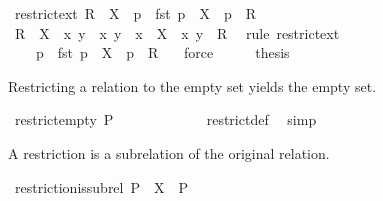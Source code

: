 \begin{isabellebody}
\isamarkupfalse%
\ restrict{\isacharunderscore}ext{\isacharprime}{\isacharcolon}\ {\isachardoublequoteopen}R\ {\isacharbar}{\isacharbar}\ X\ {\isacharequal}\ {\isacharbraceleft}p\ {\isachardot}\ fst\ p\ {\isasymin}\ X\ {\isasymand}\ p\ {\isasymin}\ R{\isacharbraceright}{\isachardoublequoteclose}\isanewline
%
\isadelimproof
%
\endisadelimproof
%
\isatagproof
{}\isamarkupfalse%
\ {\isacharminus}\isanewline
\ \ \isamarkupfalse%
\ {\isachardoublequoteopen}R\ {\isacharbar}{\isacharbar}\ X\ {\isacharequal}\ {\isacharbraceleft}{\isacharparenleft}x{\isacharcomma}\ y{\isacharparenright}\ {\isacharbar}\ x\ y\ {\isachardot}\ x\ {\isasymin}\ X\ {\isasymand}\ {\isacharparenleft}x{\isacharcomma}\ y{\isacharparenright}\ {\isasymin}\ R{\isacharbraceright}{\isachardoublequoteclose}\ \isamarkupfalse%
\ {\isacharparenleft}rule\ restrict{\isacharunderscore}ext{\isacharparenright}\isanewline
\ \ \isamarkupfalse%
\ \isamarkupfalse%
\ {\isachardoublequoteopen}{\isasymdots}\ {\isacharequal}\ {\isacharbraceleft}\ p\ {\isachardot}\ fst\ p\ {\isasymin}\ X\ {\isasymand}\ p\ {\isasymin}\ R\ {\isacharbraceright}{\isachardoublequoteclose}\ \isamarkupfalse%
\ force\isanewline
\ \ \isamarkupfalse%
\ \isamarkupfalse%
\ {\isacharquery}thesis\ \isacommand{{\isachardot}}\isamarkupfalse%
\isanewline
{}\isamarkupfalse%
%
\endisatagproof
{\isafoldproof}%
%
\isadelimproof
%
\endisadelimproof
%
\begin{isamarkuptext}%
Restricting a relation to the empty set yields the empty set.%
\end{isamarkuptext}%
\isamarkuptrue%
\isamarkupfalse%
\ restrict{\isacharunderscore}empty{\isacharcolon}\ {\isachardoublequoteopen}P\ {\isacharbar}{\isacharbar}\ {\isacharbraceleft}{\isacharbraceright}\ {\isacharequal}\ {\isacharbraceleft}{\isacharbraceright}{\isachardoublequoteclose}\ \isanewline
%
\isadelimproof
\ \ \ \ \ \ %
\endisadelimproof
%
\isatagproof
{}\isamarkupfalse%
\ restrict{\isacharunderscore}def\ \isamarkupfalse%
\ simp%
\endisatagproof
{\isafoldproof}%
%
\isadelimproof
%
\endisadelimproof
%
\begin{isamarkuptext}%
A restriction is a subrelation of the original relation.%
\end{isamarkuptext}%
\isamarkuptrue%
\isamarkupfalse%
\ restriction{\isacharunderscore}is{\isacharunderscore}subrel{\isacharcolon}\ {\isachardoublequoteopen}P\ {\isacharbar}{\isacharbar}\ X\ {\isasymsubseteq}\ P{\isachardoublequoteclose}\ \isanewline

\end{isabellebody}
